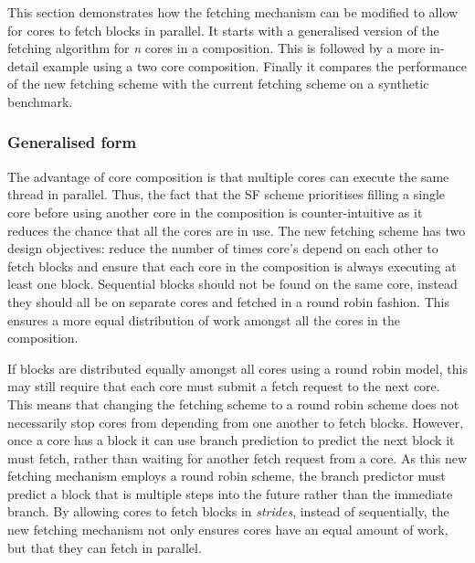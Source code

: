 This section demonstrates how the fetching mechanism can be modified to allow for cores to fetch blocks in parallel.
It starts with a generalised version of the fetching algorithm for \textit{n} cores in a composition.
This is followed by a more in-detail example using a two core composition.
Finally it compares the performance of the new fetching scheme with the current fetching scheme on a synthetic benchmark.

\subsubsection{Generalised form}
The advantage of core composition is that multiple cores can execute the same thread in parallel.
Thus, the fact that the SF scheme prioritises filling a single core before using another core in the composition is counter-intuitive as it reduces the chance that all the cores are in use.
The new fetching scheme has two design objectives: reduce the number of times core's depend on each other to fetch blocks and ensure that each core in the composition is always executing at least one block.
Sequential blocks should not be found on the same core, instead they should all be on separate cores and fetched in a round robin fashion.
This ensures a more equal distribution of work amongst all the cores in the composition.

If blocks are distributed equally amongst all cores using a round robin model, this may still require that each core must submit a fetch request to the next core.
This means that changing the fetching scheme to a round robin scheme does not necessarily stop cores from depending from one another to fetch blocks.
However, once a core has a block it can use branch prediction to predict the next block it must fetch, rather than waiting for another fetch request from a core.
As this new fetching mechanism employs a round robin scheme, the branch predictor must predict a block that is multiple steps into the future rather than the immediate branch.
By allowing cores to fetch blocks in \textit{strides}, instead of sequentially, the new fetching mechanism not only ensures cores have an equal amount of work, but that they can fetch in parallel.

